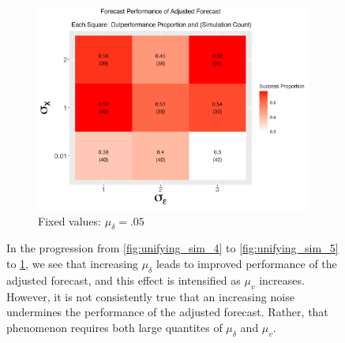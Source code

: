 \documentclass{uiucthesis2021}
\theoremstyle{definition}
\begin{document}
\begin{figure}[!h]
    \begin{subfigure}{.44\linewidth} 
      \centering
        \includegraphics[scale=.42]{simulation_plots/Nov27_160346_2024_sigmax_sigmaepsilon.png}
        \caption{Fixed values: $\mu_{\delta}=.05$}\label{fig:unifying_sim_6}
    \end{subfigure}
    
        \caption{In the progression from \ref{fig:unifying_sim_4} to \ref{fig:unifying_sim_5} to \ref{fig:unifying_sim_6}, we see that increasing $\mu_{\delta}$ leads to improved performance of the adjusted forecast, and this effect is intensified as $\mu_{v}$ increases.  However, it is not consistently true that an increasing noise undermines the performance of the adjusted forecast.  Rather, that phenomenon requires both large quantites of $\mu_{\delta}$ and $\mu_{v}$.}
        \label{fig:unifying_set_of_three_two}
      \end{figure}
  
\end{document}
